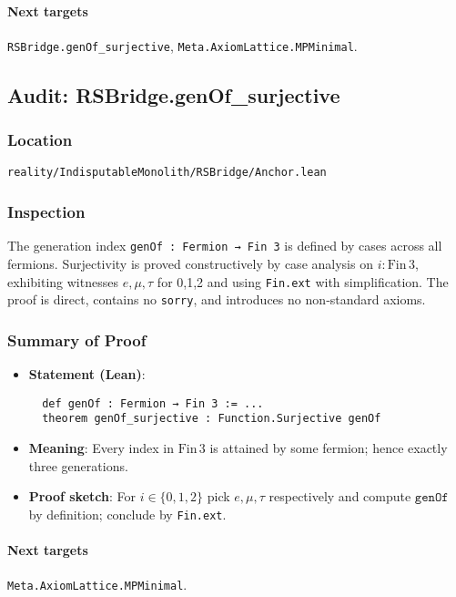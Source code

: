 \documentclass{article}
\newcommand{\FileRef}[1]{\texttt{#1}}
\begin{document}
\paragraph{Next targets} \texttt{RSBridge.genOf\_surjective}, \texttt{Meta.AxiomLattice.MPMinimal}.

\subsection{Audit: RSBridge.genOf\_surjective}
\subsubsection{Location}
\FileRef{reality/IndisputableMonolith/RSBridge/Anchor.lean}

\subsubsection{Inspection}
The generation index \texttt{genOf : Fermion → Fin 3} is defined by cases across all fermions. Surjectivity is proved constructively by case analysis on \(i: \mathrm{Fin}\,3\), exhibiting witnesses \(e,\mu,\tau\) for 0,1,2 and using \texttt{Fin.ext} with simplification. The proof is direct, contains no \texttt{sorry}, and introduces no non‑standard axioms.

\subsubsection{Summary of Proof}
\begin{itemize}[leftmargin=*]
  \item \textbf{Statement (Lean)}:
  \begin{lstlisting}
  def genOf : Fermion → Fin 3 := ...
  theorem genOf_surjective : Function.Surjective genOf
  \end{lstlisting}
  \item \textbf{Meaning}: Every index in \(\mathrm{Fin}\,3\) is attained by some fermion; hence exactly three generations.
  \item \textbf{Proof sketch}: For \(i\in\{0,1,2\}\) pick \(e,\mu,\tau\) respectively and compute \(\texttt{genOf}\) by definition; conclude by \texttt{Fin.ext}.
\end{itemize}

\paragraph{Next targets} \texttt{Meta.AxiomLattice.MPMinimal}.
\end{document}
